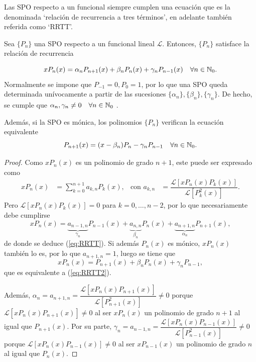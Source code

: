 Las SPO respecto a un funcional siempre cumplen una ecuación que es la denominada `relación de recurrencia a tres términos', en adelante también referida como `RRTT'.

\begin{teorema} 
    \label{th:RRTT}
    Sea $\{P_n\}$ una SPO respecto a un funcional lineal $\mathcal L$. Entonces, $\{P_n\}$ satisface la relación de recurrencia

    \begin{equation}
        \label{eq:RRTT}
        xP_n(x) = \alpha_n P_{n+1}(x) + \beta_n P_n(x) + \gamma_n P_{n-1}(x) \ \ \ \forall n\in\mathbb{N}_0.
    \end{equation}
    Normalmente se impone que $P_{-1}=0, P_0 = 1$, por lo que una SPO queda determinada unívocamente a partir de las sucesiones $\{\alpha_n\},\{\beta_n\},\{\gamma_n\}$. De hecho, se cumple que $\alpha_n,\gamma_n\neq 0 \ \ \ \forall n\in\mathbb{N}_0$ .

    Además, si la SPO es mónica, los polinomios $\{P_n\}$ verifican la ecuación equivalente
    \begin{equation}
        \label{eq:RRTT2}
        P_{n+1}(x) = (x-\beta_n) P_n - \gamma_n P_{n-1} \ \ \ \forall n\in\mathbb{N}_0.
    \end{equation}
    
\end{teorema}
\begin{proof}
    Como $xP_n(x)$ es un polinomio de grado $n+1$, este puede ser expresado como 
    \begin{align*}
        xP_n(x) &= \sum_{k=0}^{n+1} a_{k,n} P_k(x), & \text{con } a_{k,n}&= \dfrac{\mathcal{L}[xP_n(x)P_k(x)]}{\mathcal{L}[P_k^2(x)]}. 
    \end{align*}
    Pero $\mathcal{L}[xP_n(x)P_k(x)]=0$ para $k=0,\dots,n-2$, por lo que necesariamente debe cumplirse
    $$
    xP_n(x)  = \underbrace{a_{n-1,n}}_{\gamma_n} P_{n-1}(x) + \underbrace{a_{n,n}}_{\beta_n} P_n(x) + \underbrace{a_{n+1,n}}_{\alpha_n} P_{n+1}(x),
    $$
    de donde se deduce (\ref{eq:RRTT}). Si además $P_n(x)$ es mónico, $xP_n(x)$ también lo es, por lo que $a_{n+1,n}=1$, luego se tiene que 
    $$ xP_n(x)  = P_{n+1}(x) + \beta_n P_n(x) + \gamma_n P_{n-1}, $$ que es equivalente a (\ref{eq:RRTT2}).
    
    Además, $\alpha_n = a_{n+1,n}= \dfrac{\mathcal{L}[xP_n(x)P_{n+1}(x)]}{\mathcal{L}[P_{n+1}^2(x)]}\neq 0$ porque $\mathcal{L}[xP_n(x)P_{n+1}(x)]\neq 0$ al ser $xP_n(x)$ un polinomio de grado $n+1$ al igual que $P_{n+1}(x)$. Por su parte, $\gamma_n=a_{n-1,n}= \dfrac{\mathcal{L}[xP_n(x)P_{n-1}(x)]}{\mathcal{L}[P_{n-1}^2(x)]}\neq 0$ porque $\mathcal{L}[xP_n(x)P_{n-1}(x)]\neq 0$ al ser $xP_{n-1}(x)$ un polinomio de grado $n$ al igual que $P_{n}(x)$.
\end{proof}

